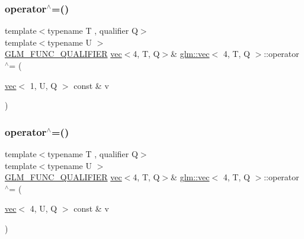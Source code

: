\mbox{\label{structglm_1_1vec_3_014_00_01_t_00_01_q_01_4_a926de242b3187323bfc98e42863c23d3}} 
\subsubsection{\texorpdfstring{operator$^\wedge$=()}{operator^=()}\hspace{0.1cm}{\footnotesize\ttfamily [5/6]}}
{\footnotesize\ttfamily template$<$typename T , qualifier Q$>$ \\
template$<$typename U $>$ \\
\mbox{\hyperlink{setup_8hpp_a33fdea6f91c5f834105f7415e2a64407}{G\+L\+M\+\_\+\+F\+U\+N\+C\+\_\+\+Q\+U\+A\+L\+I\+F\+I\+ER}} \mbox{\hyperlink{structglm_1_1vec}{vec}}$<$4, T, Q$>$\& \mbox{\hyperlink{structglm_1_1vec}{glm\+::vec}}$<$ 4, T, Q $>$\+::operator$^\wedge$= (\begin{DoxyParamCaption}\item[{\mbox{\hyperlink{structglm_1_1vec}{vec}}$<$ 1, U, Q $>$ const \&}]{v }\end{DoxyParamCaption})}

\mbox{\label{structglm_1_1vec_3_014_00_01_t_00_01_q_01_4_adfc4f1060841f2652c19c17d9980019a}} 
\subsubsection{\texorpdfstring{operator$^\wedge$=()}{operator^=()}\hspace{0.1cm}{\footnotesize\ttfamily [6/6]}}
{\footnotesize\ttfamily template$<$typename T , qualifier Q$>$ \\
template$<$typename U $>$ \\
\mbox{\hyperlink{setup_8hpp_a33fdea6f91c5f834105f7415e2a64407}{G\+L\+M\+\_\+\+F\+U\+N\+C\+\_\+\+Q\+U\+A\+L\+I\+F\+I\+ER}} \mbox{\hyperlink{structglm_1_1vec}{vec}}$<$4, T, Q$>$\& \mbox{\hyperlink{structglm_1_1vec}{glm\+::vec}}$<$ 4, T, Q $>$\+::operator$^\wedge$= (\begin{DoxyParamCaption}\item[{\mbox{\hyperlink{structglm_1_1vec}{vec}}$<$ 4, U, Q $>$ const \&}]{v }\end{DoxyParamCaption})}

